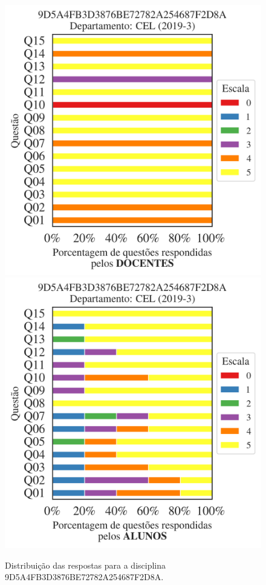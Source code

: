 \documentclass[a4paper,10pt]{article}
\begin{document}
\begin{figure}[h]
\centering
\includegraphics[width=0.485\linewidth]{analise_disciplina_departamento_CEL_9D5A4FB3D3876BE72782A254687F2D8A_docentes.png}
\includegraphics[width=0.485\linewidth]{analise_disciplina_departamento_CEL_9D5A4FB3D3876BE72782A254687F2D8A_alunos.png}
\caption{\label{fig:analise_geral_departamento}                Distribuição das respostas para a disciplina 9D5A4FB3D3876BE72782A254687F2D8A. }
\end{figure}
\end{document}
